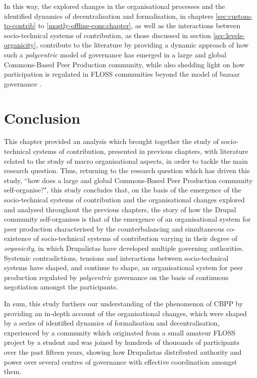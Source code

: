 In this way, the explored changes in the organisational processes and the identified dynamics of decentralisation and formalisation, in chapters \ref{sec:custom-to-contrib} to \ref{mostly-offline-cons:chapter}, as well as the interactions between socio-technical systems of contribution, as those discussed in section \ref{sec:levels-organicity}, contribute to the literature by providing a dynamic approach of how such a \textit{polycentric} model of governance has emerged in a large and global Commons-Based Peer Production community, while also shedding light on how participation is regulated in FLOSS communities beyond the model of bazaar governance \parencite{Demil2006}.

\section{Conclusion}

This chapter provided an analysis which brought together the study of socio-technical systems of contribution, presented in previous chapters, with literature related to the study of macro organisational aspects, in order to tackle the main research question. Thus, returning to the research question which has driven this study, ``how does a large and global Commons-Based Peer Production community self-organise?", this study concludes that, on the basis of the emergence of the socio-technical systems of contribution and the organisational changes explored and analysed throughout the previous chapters, the story of how the Drupal community self-organises is that of the emergence of an organisational system for peer production characterised by the counterbalancing and simultaneous co-existence of socio-technical systems of contribution varying in their degree of \textit{organicity}, in which Drupalistas have developed multiple governing authorities. Systemic contradictions, tensions and interactions between socio-technical systems have shaped, and continue to shape, an organisational system for peer production regulated by \textit{polycentric} governance on the basis of continuous negotiation amongst the participants.

In sum, this study furthers our understanding of the phenomenon of CBPP by providing an in-depth account of the organisational changes, which were shaped by a series of identified dynamics of formalisation and decentralisation, experienced by a community which originated from a small amateur FLOSS project by a student and was joined by hundreds of thousands of participants over the past fifteen years, showing how Drupalistas distributed authority and power over several centres of governance with effective coordination amongst them.

